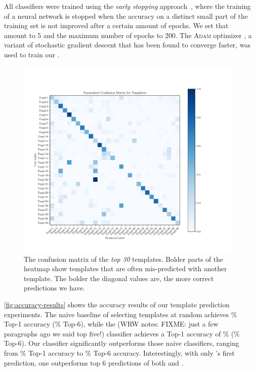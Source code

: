 All classifiers were trained using the \emph{early stopping} approach~\cite{FIXME}, 
where the
training of a neural network is stopped when the accuracy on a distinct small
part of the training set is not improved after a certain amount of epochs. We
set that amount to 5 and the maximum number of epochs to 200. The \textsc{Adam}
optimizer \citep{Kingma2014-ng}, a variant of stochastic gradient descent that
has been found to converge faster, was used to train our \dnn.



\begin{figure}[t]
  \centering
  \includegraphics[trim={30 40 100 70},clip,width=\linewidth]{evaluation-conf-matrix.pdf}
  \caption{The confusion matrix of the \emph{top 30} templates. Bolder parts of
  the heatmap show templates that are often mis-predicted with another template.
  The bolder the diagonal values are, the more correct predictions we have.}
  \label{fig:conf-matrix}
\end{figure}

\autoref{fig:accuracy-results} shows the accuracy results of our template
prediction experiments. The naive baseline of selecting templates at random
achieves \RandomTopOne\% Top-1 accuracy (\RandomTopSix\% Top-6), while the
(WRW notes: FIXME: just a few paragraphs ago we said top five!) 
\popular classifier achieves a Top-1 accuracy of \PopularTopOne\%
(\PopularTopSix\% Top-6). Our \dnn classifier significantly outperforms those naive
classifiers, ranging from \DnnTopOne\% Top-1 accuracy to \DnnTopSix\% Top-6
accuracy. Interestingly, with only \dnn's first prediction, one outperforms top
6 predictions of both \random and \popular.

